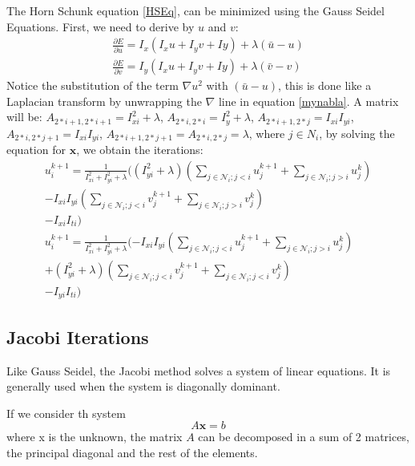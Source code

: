 \documentclass[12pt,a4paper,twoside]{report}
\begin{document}
The Horn Schunk equation \ref{HSEq}, can be minimized using the Gauss Seidel Equations.
First, we need to derive by $u$  and $v$:
\begin{equation} \label{partialDer}
\begin{split} 
\frac{\partial E}{\partial u} = I_x(I_xu+I_yv+Iy) + \lambda(\bar{u}-u) \\
\frac{\partial E}{\partial v} = I_y(I_xu+I_yv+Iy) + \lambda(\bar{v}-v)
\end{split}
\end{equation}
Notice the substitution of the term $\nabla u ^2$ with $(\bar{u}-u)$, this is done like a Laplacian transform by unwrapping the $\nabla$ line in equation \ref{mynabla}.
 A matrix will be: 
$A_{2*i+1, 2*i+1} = I^2_{xi}+ \lambda$,
 $A_{2*i, 2*i} = I^2_{y}+ \lambda$,
$A_{2*i+1, 2*j} = I_{xi}I_{yi}$,  
$A_{2*i, 2*j+1} = I_{xi}I_{yi}$, 
 $A_{2*i+1, 2*j+1} = A_{2*i, 2*j} = \lambda$, where $j \in N_i $, by solving the equation for $\boldsymbol{x}$, we obtain the iterations:
 \begin{equation} \label{GSEq}
 \begin{split}
 u^{k+1}_i = \frac{1}{I_{xi}^2+I_{yi}^2+ \lambda}
					 (
					 (I_{yi}^2+\lambda)(\sum_{j \in \mathcal{N}_i;j<i} u_j^{k+1} + \sum_{j \in \mathcal{N}_i;j>i} u_j^k) \\
					 -I_{xi}I_{yi}(\sum_{j \in \mathcal{N}_i;j<i} v_j^{k+1} + \sum_{j \in \mathcal{N}_i;j>i} v_j^k)\\
					 -I_{xi}I_{ti}
					)
					 \\
   u^{k+1}_i = \frac{1}{I_{xi}^2+I_{yi}^2+ \lambda}
			   (
			   -I_{xi}I_{yi}(\sum_{j \in \mathcal{N}_i;j<i} u_j^{k+1} + \sum_{j \in \mathcal{N}_i;j>i} u_j^k)\\
			   +(I_{yi}^2+\lambda)(\sum_{j \in \mathcal{N}_i;j<i} v_j^{k+1} + \sum_{j \in \mathcal{N}_i;j<i} v_j^k)\\
			   -I_{yi}I_{ti}
			   )
 \end{split}
 \end{equation}
\subsection{Jacobi Iterations}
Like Gauss Seidel, the Jacobi method solves a system of linear equations. It is generally used when the system is diagonally dominant. 

If we consider th system 
\begin{equation}
	A\boldsymbol{x} = b
\end{equation}
where x is the unknown, the matrix $A$ can be decomposed in a sum of 2 matrices, the principal diagonal and the rest of the elements.
\end{document}
